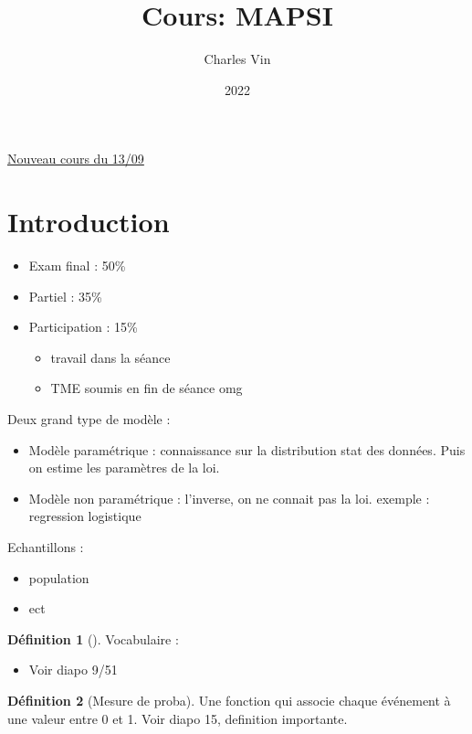 \documentclass{article}
\title{Cours: MAPSI}
\author{Charles Vin}
\date{2022}
\theoremstyle{plain}%
\theoremstyle{definition}
\newtheorem{defn}{Définition}[section]
\theoremstyle{remark}
\begin{document}
\maketitle
\underline{Nouveau cours du 13/09} \\
\section{Introduction}

\begin{itemize}
    \item Exam final : 50\%
    \item Partiel : 35\%
    \item Participation : 15\%
    \begin{itemize}
        \item travail dans la séance
        \item TME soumis en fin de séance omg 
    \end{itemize}
\end{itemize}

Deux grand type de modèle : \begin{itemize}
    \item Modèle paramétrique : connaissance sur la distribution stat des données. Puis on estime les paramètres de la loi.
    \item Modèle non paramétrique : l'inverse, on ne connait pas la loi. exemple : regression logistique
\end{itemize}

Echantillons : \begin{itemize}
    \item population
    \item ect 
\end{itemize}

\begin{defn}[]
    Vocabulaire :   
    \begin{itemize}
        \item Voir diapo 9/51
    \end{itemize}
\end{defn}

\begin{defn}[Mesure de proba]
    Une fonction qui associe chaque événement à une valeur entre 0 et 1.
    Voir diapo 15, definition importante.
\end{defn}
\end{document}
